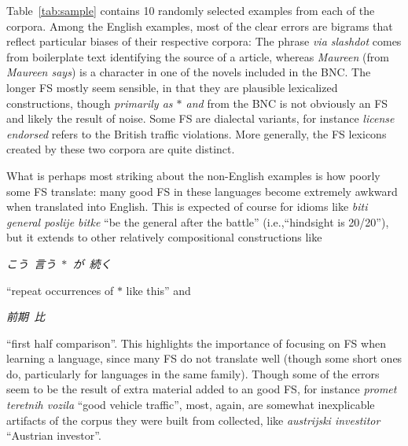 \documentclass[11pt,letterpaper]{article}
\makeatletter
\def \ie {i.e.,\@ }
\newcommand{\gap}{$*$\xspace}
\newcommand{\ex}[1]{\textit{#1}\xspace}
\newcommand{\gl}[1]{``#1''\xspace}
\newcommand{\tabref}[2][]{Table#1~\ref{#2}\xspace}
\makeatother
\begin{document}
\tabref{tab:sample} contains 10 randomly selected examples from each of the corpora. Among the English examples, most of the clear errors are bigrams that reflect particular biases of their respective corpora: The phrase \ex{via slashdot} comes from boilerplate text identifying the source of a article, whereas \ex{Maureen} (from \ex{Maureen says}) is a character in one of the novels included in the BNC. The longer FS mostly seem sensible, in that they are plausible lexicalized constructions, though \ex{primarily as \gap and} from the BNC is not obviously an FS and likely the result of noise. Some FS are dialectal variants, for instance \ex{license endorsed} refers to the British traffic violations. More generally, the FS lexicons created by these two corpora are quite distinct.

What is perhaps most striking about the non-English examples is how poorly some FS translate: many good FS in these languages become extremely awkward when translated into English. This is expected of course for idioms like \ex{biti general poslije bitke} \gl{be the general after the battle} (\ie \gl{hindsight is 20/20}), but it extends to other relatively compositional  constructions like 
\begin{CJK*}{UTF8}{min} \ex{こう\ 言う\ \gap\ が\ 続く} \end{CJK*} 
\gl{repeat occurrences of \gap like this} and 
\begin{CJK*}{UTF8}{min} \ex{前期\ 比} \end{CJK*} 
\gl{first half comparison}. This highlights the importance of focusing on FS when learning a language, since many FS do not translate well (though some short ones do, particularly for languages in the same family). Though some of the errors seem to be the result of extra material added to an good FS, for instance \ex{promet teretnih vozila} \gl{good vehicle traffic}, most, again, are somewhat inexplicable artifacts of the corpus they were built from collected, like \ex{austrijski investitor} \gl{Austrian investor}.
\end{document}
